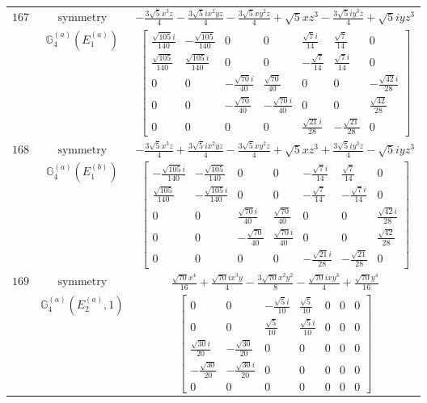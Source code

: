 \documentclass[fleqn,8pt,landscape]{jsarticle}
\begin{document}
\begin{longtable}{ccc}
$ 167 $ & $ \text{symmetry} $ & $ - \frac{3 \sqrt{5} x^{3} z}{4} - \frac{3 \sqrt{5} i x^{2} y z}{4} - \frac{3 \sqrt{5} x y^{2} z}{4} + \sqrt{5} x z^{3} - \frac{3 \sqrt{5} i y^{3} z}{4} + \sqrt{5} i y z^{3} $ \\
$  $ & $ \mathbb{G}_{4}^{(a)}(E_{1}^{(a)}) $ & $ \begin{bmatrix} \frac{\sqrt{105} i}{140} & - \frac{\sqrt{105}}{140} & 0 & 0 & \frac{\sqrt{7} i}{14} & \frac{\sqrt{7}}{14} & 0 \\ \frac{\sqrt{105}}{140} & \frac{\sqrt{105} i}{140} & 0 & 0 & - \frac{\sqrt{7}}{14} & \frac{\sqrt{7} i}{14} & 0 \\ 0 & 0 & - \frac{\sqrt{70} i}{40} & \frac{\sqrt{70}}{40} & 0 & 0 & - \frac{\sqrt{42} i}{28} \\ 0 & 0 & - \frac{\sqrt{70}}{40} & - \frac{\sqrt{70} i}{40} & 0 & 0 & \frac{\sqrt{42}}{28} \\ 0 & 0 & 0 & 0 & \frac{\sqrt{21} i}{28} & - \frac{\sqrt{21}}{28} & 0 \end{bmatrix} $ \\ \hline
$ 168 $ & $ \text{symmetry} $ & $ - \frac{3 \sqrt{5} x^{3} z}{4} + \frac{3 \sqrt{5} i x^{2} y z}{4} - \frac{3 \sqrt{5} x y^{2} z}{4} + \sqrt{5} x z^{3} + \frac{3 \sqrt{5} i y^{3} z}{4} - \sqrt{5} i y z^{3} $ \\
$  $ & $ \mathbb{G}_{4}^{(a)}(E_{1}^{(b)}) $ & $ \begin{bmatrix} - \frac{\sqrt{105} i}{140} & - \frac{\sqrt{105}}{140} & 0 & 0 & - \frac{\sqrt{7} i}{14} & \frac{\sqrt{7}}{14} & 0 \\ \frac{\sqrt{105}}{140} & - \frac{\sqrt{105} i}{140} & 0 & 0 & - \frac{\sqrt{7}}{14} & - \frac{\sqrt{7} i}{14} & 0 \\ 0 & 0 & \frac{\sqrt{70} i}{40} & \frac{\sqrt{70}}{40} & 0 & 0 & \frac{\sqrt{42} i}{28} \\ 0 & 0 & - \frac{\sqrt{70}}{40} & \frac{\sqrt{70} i}{40} & 0 & 0 & \frac{\sqrt{42}}{28} \\ 0 & 0 & 0 & 0 & - \frac{\sqrt{21} i}{28} & - \frac{\sqrt{21}}{28} & 0 \end{bmatrix} $ \\ \hline
$ 169 $ & $ \text{symmetry} $ & $ \frac{\sqrt{70} x^{4}}{16} + \frac{\sqrt{70} i x^{3} y}{4} - \frac{3 \sqrt{70} x^{2} y^{2}}{8} - \frac{\sqrt{70} i x y^{3}}{4} + \frac{\sqrt{70} y^{4}}{16} $ \\
$  $ & $ \mathbb{G}_{4}^{(a)}(E_{2}^{(a)},1) $ & $ \begin{bmatrix} 0 & 0 & - \frac{\sqrt{5} i}{10} & \frac{\sqrt{5}}{10} & 0 & 0 & 0 \\ 0 & 0 & \frac{\sqrt{5}}{10} & \frac{\sqrt{5} i}{10} & 0 & 0 & 0 \\ \frac{\sqrt{30} i}{20} & - \frac{\sqrt{30}}{20} & 0 & 0 & 0 & 0 & 0 \\ - \frac{\sqrt{30}}{20} & - \frac{\sqrt{30} i}{20} & 0 & 0 & 0 & 0 & 0 \\ 0 & 0 & 0 & 0 & 0 & 0 & 0 \end{bmatrix} $ \\ \hline

\end{longtable}
\end{document}
